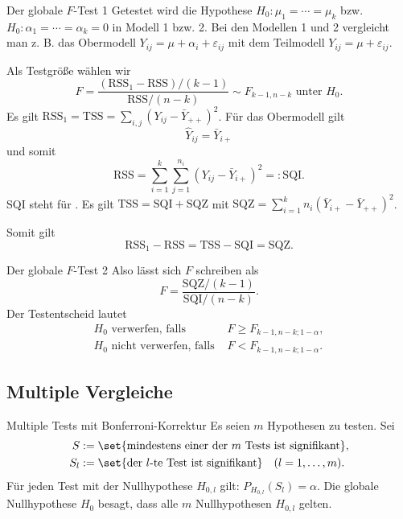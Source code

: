 \begin{karte}{Der globale \(F\)-Test 1}
Getestet wird die Hypothese \(H_0: \mu_1 = \cdots = \mu_k\) bzw. \(H_0: \alpha_1 = \cdots = \alpha_k = 0\) in Modell 1 bzw. 2.
Bei den Modellen 1 und 2 vergleicht man z. B. das Obermodell \(Y_{ij} = \mu + \alpha_i + \varepsilon_{ij}\) 
mit dem Teilmodell \(Y_{ij} = \mu + \varepsilon_{ij}\).

Als Testgröße wählen wir 
\[ F = \frac{(\mathrm{RSS}_1 - \mathrm{RSS})/(k-1)}{\mathrm{RSS}/(n-k)} \sim F_{k-1,n-k} \text{ unter } H_0. \]
Es gilt \(\mathrm{RSS}_1 = \mathrm{TSS} = \sum_{i,j} (Y_{ij} - \bar{Y}_{++})^2\).
Für das Obermodell gilt 
\[ \hat{Y}_{ij} = \bar{Y}_{i+} \]
und somit 
\[ \mathrm{RSS} = \sum_{i=1}^k \sum_{j=1}^{n_i} (Y_{ij} - \bar{Y}_{i+})^2 =: \mathrm{SQI}. \]
SQI steht für . 
Es gilt \(\mathrm{TSS} = \mathrm{SQI} + \mathrm{SQZ}\) mit \(\mathrm{SQZ} = \sum_{i=1}^k n_i (\bar{Y}_{i+} - \bar{Y}_{++})^2\). 

Somit gilt \[\mathrm{RSS}_1 - \mathrm{RSS} = \mathrm{TSS} - \mathrm{SQI} = \mathrm{SQZ}. \]
\end{karte}

\begin{karte}{Der globale \(F\)-Test 2}
Also lässt sich \(F\) schreiben als \[F = \frac{\mathrm{SQZ}/(k-1)}{\mathrm{SQI}/(n-k)}. \]
Der Testentscheid lautet 
\begin{align*}
    H_0 \text{ verwerfen, falls } & F \geq F_{k-1,n-k;1-\alpha}, \\
    H_0 \text{ nicht verwerfen, falls } & F < F_{k-1,n-k;1-\alpha}.
\end{align*}
\end{karte}

\subsection{Multiple Vergleiche}

\begin{karte}{Multiple Tests mit Bonferroni-Korrektur}
Es seien \(m\) Hypothesen zu testen. Sei 
\begin{align*}
    S &:= \set{\text{mindestens einer der \(m\) Tests ist signifikant}}, \\
    S_l &:= \set{\text{der \(l\)-te Test ist signifikant}} \quad (l=1,\ldots, m).
\end{align*}
Für jeden Test mit der Nullhypothese \(H_{0,l}\) gilt: \(P_{H_{0,l}}(S_l) = \alpha\).
Die globale Nullhypothese \(H_0\) besagt, dass alle \(m\) Nullhypothesen \(H_{0,l}\) gelten.
\end{karte}

